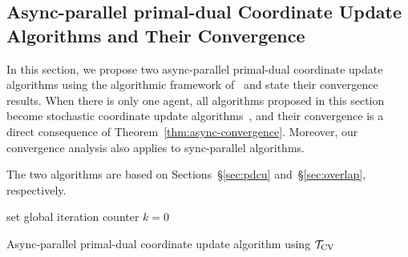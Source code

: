 {{{\subsection{Async-parallel primal-dual Coordinate Update Algorithms and Their Convergence}

In this section, we propose two async-parallel primal-dual coordinate update algorithms using the algorithmic framework of~\cite{Peng_2015_AROCK} and state their convergence results. 
When there is only one agent, all algorithms proposed in this section become stochastic coordinate update algorithms~\cite{Patrick_2015}, and their convergence is a direct consequence of Theorem~\ref{thm:async-convergence}. Moreover, our convergence analysis also applies to sync-parallel algorithms.



The two algorithms are based on Sections~\S\ref{sec:pdcu} and~\S\ref{sec:overlap}, respectively.





\begin{algorithm}[H]\label{alg:asyn_core}
{}
 set global iteration
counter $k=0$\; 
 \caption{Async-parallel primal-dual coordinate update algorithm using ${{\mathcal{T}}_{\textnormal{CV}}}$}
\end{algorithm}

}}}
